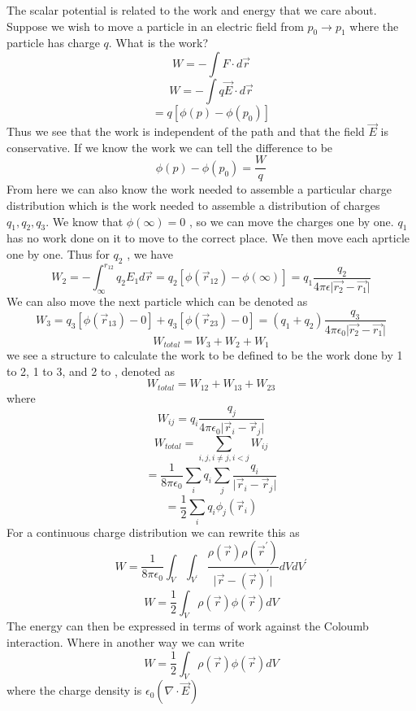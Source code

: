 \begin{remark}
    The scalar potential is related to the work and energy that we care about. Suppose we wish to move a particle in an electric field 
    from \(p_0 \to  p_1\) where the particle has charge \(q\). What is the work?
    \[
        W = -\int F \cdot d \vec{r} 
    \]
    \[
        W = - \int q \vec{E}  \cdot d \vec{r} 
    \]
    \[
        = q \left[ \phi (p) - \phi (p_0) \right] 
    \]
    Thus we see that the work is independent of the path and that the field \(\vec{E} \) is conservative. 
    If we know the work we can tell the difference to be 
    \[
        \phi (p)-\phi (p_0) = \frac{W}{q}
    \]
    From here we can also know the work needed to assemble a particular charge distribution which is the work needed to assemble a 
    distribution of charges \(q_1, q_2, q_3\). We know that \(\phi (\infty ) = 0\) , so we can move the charges one by one. 
    \(q_1\) has no work done on it to move to the correct place. We then move each aprticle one by one. Thus for \(q_2\) , we have 
    \[
        W_2 = - \int_{\infty }^{r_{12} } q_2 E_1 d \vec{r} = q_2 [\phi (\vec{r}_{12} ) - \phi (\infty )] = q_1 \frac{q_2}{4\pi \epsilon \vert \vec{r_2} - \vec{r_1}  \vert }
    \]
    We can also move the next particle which can be denoted as 
    \[
        W_3 = q_3[\phi (\vec{r}_{13} ) - 0] + q_3[\phi(\vec{r}_{23} )- 0]= (q_1 + q_2 )\frac{q_3}{4\pi \epsilon _0 \vert \vec{r_2} -\vec{r_1}  \vert }
    \]
    \[
        W_{total} = W_3 + W_2 + W_1 
    \]
    we see a structure to calculate the work to be defined to be the work done by 1 to 2, 1 to 3, and 2 to , denoted as 
    \[
        W_{total} = W_{12}+ W_{13} + W_{23}    
    \]
    where 
    \[
        W_{ij} = q_i\frac{q_j}{4\pi  \epsilon_0 \vert \vec{r} _i - \vec{r} _j \vert } 
    \]
    \[
        W_{total} = \sum_{i,j, i \neq j, i < j} W_{ij}   
    \]
    \[
       = \frac{1}{8\pi \epsilon _0} \sum_{i} q_i \sum_{j} \frac{q_i}{\vert \vec{r} _i - \vec{r} _j \vert } 
    \]
    \[
        = \frac{1}{2}\sum_{i} q_i \phi _j (\vec{r} _i) 
    \]
    For a continuous charge distribution we can rewrite this as 
    \[
        W= \frac{1}{8 \pi \epsilon _0} \int _V \int _{V^{\prime}} \frac{\rho (\vec{r} ) \rho ( \vec{r} ^{\prime} )}{\vert \vec{r} -(\vec{r} )^{\prime}  \vert }dV dV^{\prime} 
    \]
    \[
        W= \frac{1}{2} \int _V \rho (\vec{r} )\phi (\vec{r} )dV
    \]
    The energy can then be expressed in terms of work against the Coloumb interaction. Where in another way we can write 
    \[
        W = \frac{1}{2} \int _V \rho (\vec{r} ) \phi (\vec{r} ) dV
    \]
    where the charge density is \(\epsilon _0 (\nabla \cdot\vec{E} )\) 

\end{remark}
